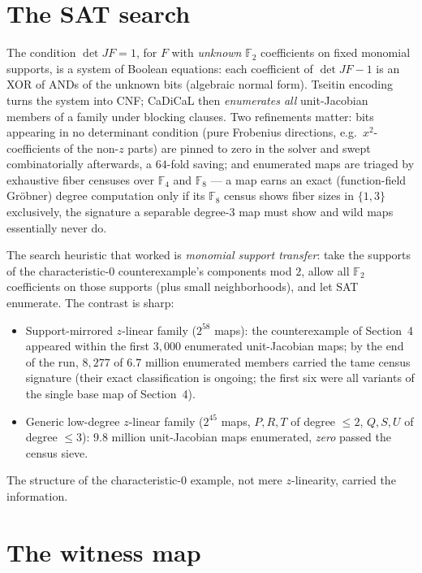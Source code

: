 \documentclass[11pt]{amsart}
\newcommand{\F}{\mathbb{F}}
\begin{document}
\section{The SAT search}

The condition $\det JF = 1$, for $F$ with \emph{unknown} $\F_2$
coefficients on fixed monomial supports, is a system of Boolean
equations: each coefficient of $\det JF - 1$ is an XOR of ANDs of the
unknown bits (algebraic normal form). Tseitin encoding turns the
system into CNF; CaDiCaL then \emph{enumerates all} unit-Jacobian
members of a family under blocking clauses. Two refinements matter:
bits appearing in no determinant condition (pure Frobenius directions,
e.g.\ $x^2$-coefficients of the non-$z$ parts) are pinned to zero in
the solver and swept combinatorially afterwards, a $64$-fold saving;
and enumerated maps are triaged by exhaustive fiber censuses over
$\F_4$ and $\F_8$ --- a map earns an exact (function-field Gr\"obner)
degree computation only if its $\F_8$ census shows fiber sizes in
$\{1,3\}$ exclusively, the signature a separable degree-$3$ map must
show and wild maps essentially never do.

The search heuristic that worked is \emph{monomial support transfer}:
take the supports of the characteristic-$0$ counterexample's components
mod $2$, allow all $\F_2$ coefficients on those supports (plus small
neighborhoods), and let SAT enumerate. The contrast is sharp:

\begin{itemize}
\item Support-mirrored $z$-linear family ($2^{58}$ maps): the
counterexample of Section~4 appeared within the first $3{,}000$
enumerated unit-Jacobian maps; by the end of the run, $8{,}277$ of
$6.7$ million enumerated members carried the tame census signature
(their exact classification is ongoing; the first six were all variants
of the single base map of Section~4).
\item Generic low-degree $z$-linear family ($2^{45}$ maps,
$P,R,T$ of degree $\le 2$, $Q,S,U$ of degree $\le 3$):
$9.8$ million unit-Jacobian maps enumerated, \emph{zero} passed the
census sieve.
\end{itemize}

The structure of the characteristic-$0$ example, not mere
$z$-linearity, carried the information.

\section{The witness map}
\end{document}
